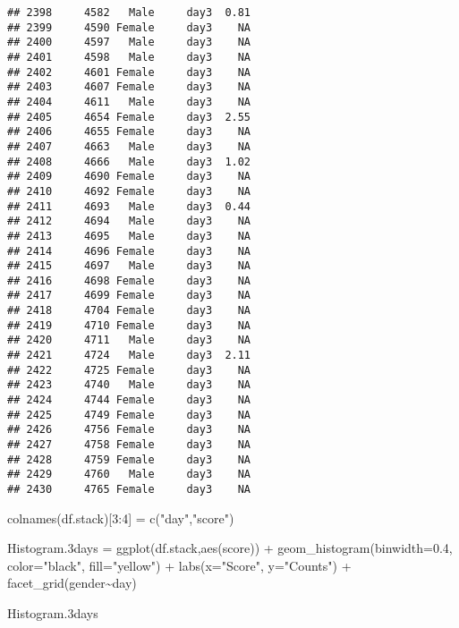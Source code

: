 \documentclass[
]{article}
\newenvironment{Shaded}{\begin{snugshade}}{\end{snugshade}}
\newcommand{\AttributeTok}[1]{\textcolor[rgb]{0.77,0.63,0.00}{#1}}
\newcommand{\DecValTok}[1]{\textcolor[rgb]{0.00,0.00,0.81}{#1}}
\newcommand{\FloatTok}[1]{\textcolor[rgb]{0.00,0.00,0.81}{#1}}
\newcommand{\FunctionTok}[1]{\textcolor[rgb]{0.00,0.00,0.00}{#1}}
\newcommand{\NormalTok}[1]{#1}
\newcommand{\OtherTok}[1]{\textcolor[rgb]{0.56,0.35,0.01}{#1}}
\newcommand{\SpecialCharTok}[1]{\textcolor[rgb]{0.00,0.00,0.00}{#1}}
\newcommand{\StringTok}[1]{\textcolor[rgb]{0.31,0.60,0.02}{#1}}
\begin{document}
\begin{verbatim}
## 2398     4582   Male     day3  0.81
## 2399     4590 Female     day3    NA
## 2400     4597   Male     day3    NA
## 2401     4598   Male     day3    NA
## 2402     4601 Female     day3    NA
## 2403     4607 Female     day3    NA
## 2404     4611   Male     day3    NA
## 2405     4654 Female     day3  2.55
## 2406     4655 Female     day3    NA
## 2407     4663   Male     day3    NA
## 2408     4666   Male     day3  1.02
## 2409     4690 Female     day3    NA
## 2410     4692 Female     day3    NA
## 2411     4693   Male     day3  0.44
## 2412     4694   Male     day3    NA
## 2413     4695   Male     day3    NA
## 2414     4696 Female     day3    NA
## 2415     4697   Male     day3    NA
## 2416     4698 Female     day3    NA
## 2417     4699 Female     day3    NA
## 2418     4704 Female     day3    NA
## 2419     4710 Female     day3    NA
## 2420     4711   Male     day3    NA
## 2421     4724   Male     day3  2.11
## 2422     4725 Female     day3    NA
## 2423     4740   Male     day3    NA
## 2424     4744 Female     day3    NA
## 2425     4749 Female     day3    NA
## 2426     4756 Female     day3    NA
## 2427     4758 Female     day3    NA
## 2428     4759 Female     day3    NA
## 2429     4760   Male     day3    NA
## 2430     4765 Female     day3    NA
\end{verbatim}

\begin{Shaded}
\begin{Highlighting}[]
\FunctionTok{colnames}\NormalTok{(df.stack)[}\DecValTok{3}\SpecialCharTok{:}\DecValTok{4}\NormalTok{] }\OtherTok{=} \FunctionTok{c}\NormalTok{(}\StringTok{"day"}\NormalTok{,}\StringTok{"score"}\NormalTok{)}
\end{Highlighting}
\end{Shaded}

\begin{Shaded}
\begin{Highlighting}[]
\NormalTok{Histogram}\FloatTok{.3}\NormalTok{days }\OtherTok{=} \FunctionTok{ggplot}\NormalTok{(df.stack,}\FunctionTok{aes}\NormalTok{(score)) }\SpecialCharTok{+} 
                  \FunctionTok{geom\_histogram}\NormalTok{(}\AttributeTok{binwidth=}\FloatTok{0.4}\NormalTok{, }\AttributeTok{color=}\StringTok{"black"}\NormalTok{, }\AttributeTok{fill=}\StringTok{"yellow"}\NormalTok{) }\SpecialCharTok{+} 
                  \FunctionTok{labs}\NormalTok{(}\AttributeTok{x=}\StringTok{"Score"}\NormalTok{, }\AttributeTok{y=}\StringTok{"Counts"}\NormalTok{) }\SpecialCharTok{+} 
                  \FunctionTok{facet\_grid}\NormalTok{(gender}\SpecialCharTok{\textasciitilde{}}\NormalTok{day)}

\NormalTok{Histogram}\FloatTok{.3}\NormalTok{days}
\end{Highlighting}
\end{Shaded}
\end{document}

